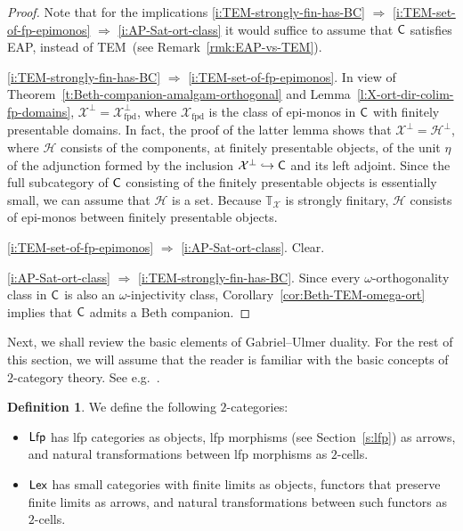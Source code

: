 \documentclass[a4paper,10pt,reqno]{amsart}
\theoremstyle{definition}
\newtheorem{definition}[theorem]{Definition}
\theoremstyle{remark}
\newcommand{\cat}{{\sf C}}								%
\newcommand{\Lfp}{{\sf Lfp}}								%
\newcommand{\Lex}{{\sf Lex}}								%
\newcommand{\ar}[1]{\mathcal{#1}}							%
\newcommand{\X}{\ar{X}}									%
\newcommand{\into}{\hookrightarrow}						%
\newcommand{\ort}[1]{{#1}^{\perp}}						%
\newcommand{\IMP}{\Rightarrow}						%
\newcommand{\EAP}{\textnormal{EAP}}
\newcommand{\TEM}{\textnormal{TEM}}
\begin{document}
\begin{proof}
 Note that for the implications \ref{i:TEM-strongly-fin-has-BC} $\IMP$ \ref{i:TEM-set-of-fp-epimonos} $\IMP$ \ref{i:AP-Sat-ort-class} it would suffice to assume that $\cat$ satisfies \EAP, instead of \TEM~(see Remark~\ref{rmk:EAP-vs-TEM}).
 
\ref{i:TEM-strongly-fin-has-BC} $\IMP$ \ref{i:TEM-set-of-fp-epimonos}. In view of Theorem~\ref{t:Beth-companion-amalgam-orthogonal} and Lemma~\ref{l:X-ort-dir-colim-fp-domains}, $\ort{\X}=\X^{\perp}_{\mathrm{fpd}}$, where $\X_{\mathrm{fpd}}$ is the class of epi-monos in $\cat$ with finitely presentable domains. In fact, the proof of the latter lemma shows that $\ort{\X}=\ort{\ar{H}}$, where $\ar{H}$ consists of the components, at finitely presentable objects, of the unit $\eta$ of the adjunction formed by the inclusion $\ort{\X}\into \cat$ and its left adjoint. Since the full subcategory of $\cat$ consisting of the finitely presentable objects is essentially small, we can assume that $\ar{H}$ is a set. Because $\mathbb{T}_{\X}$ is strongly finitary, $\ar{H}$ consists of epi-monos between finitely presentable objects.

\ref{i:TEM-set-of-fp-epimonos} $\IMP$ \ref{i:AP-Sat-ort-class}. Clear.

\ref{i:AP-Sat-ort-class} $\IMP$ \ref{i:TEM-strongly-fin-has-BC}. Since every $\omega$-orthogonality class in $\cat$ is also an $\omega$-injectivity class, Corollary~\ref{cor:Beth-TEM-omega-ort} implies that $\cat$ admits a Beth companion.
\end{proof}

Next, we shall review the basic elements of Gabriel--Ulmer duality. For the rest of this section, we will assume that the reader is familiar with the basic concepts of $2$-category theory. See e.g.\ \cite{Lack2010}.

\begin{definition}
We define the following $2$-categories:
\begin{itemize}
\item $\Lfp$ has lfp categories as objects, lfp morphisms (see Section~\ref{s:lfp}) as arrows, and natural transformations between lfp morphisms as $2$-cells.
\item $\Lex$ has small categories with finite limits as objects, functors that preserve finite limits as arrows, and natural transformations between such functors as $2$-cells.
\end{itemize}
\end{definition}
\end{document}
